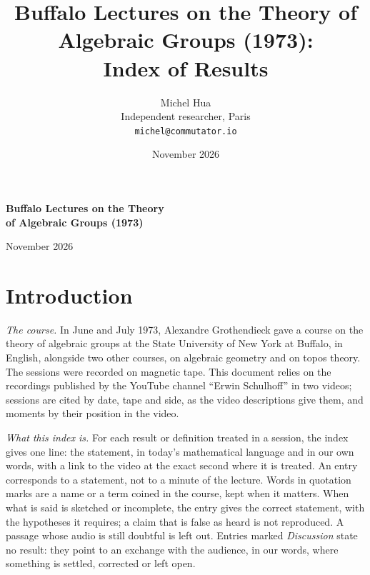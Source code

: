 \documentclass[11pt]{article}
\title{\Large Buffalo Lectures on the Theory of Algebraic Groups (1973):\\ Index of Results}
\author{Michel Hua\\ \small Independent researcher, Paris\\ \small \texttt{michel@commutator.io}}
\date{\small November 2026}
\newcommand{\q}[1]{``#1''}
\begin{document}
\begin{titlepage}
\centering\vspace*{3cm}
{\LARGE\bfseries Buffalo Lectures on the Theory\\[0.4em] of Algebraic Groups (1973)\par}
\vspace{0.8cm}{\Large Index of Results\par}
\vspace{2cm}{\large Alexandre Grothendieck, State University of New York at Buffalo\\ June--July 1973\par}
\vfill{\small November 2026\par}
\end{titlepage}
\setcounter{tocdepth}{1}
\tableofcontents
\clearpage{}
\clearpage

\section*{Introduction}

\emph{The course.} In June and July 1973, Alexandre Grothendieck gave a course on the theory of algebraic groups at the State University of New York at Buffalo, in English, alongside two other courses, on algebraic geometry and on topos theory. The sessions were recorded on magnetic tape. This document relies on the recordings published by the YouTube channel \q{Erwin Schulhoff} in two videos; sessions are cited by date, tape and side, as the video descriptions give them, and moments by their position in the video.

\emph{What this index is.} For each result or definition treated in a session, the index gives one line: the statement, in today’s mathematical language and in our own words, with a link to the video at the exact second where it is treated. An entry corresponds to a statement, not to a minute of the lecture. Words in quotation marks are a name or a term coined in the course, kept when it matters. When what is said is sketched or incomplete, the entry gives the correct statement, with the hypotheses it requires; a claim that is false as heard is not reproduced. A passage whose audio is still doubtful is left out. Entries marked \emph{Discussion} state no result: they point to an exchange with the audience, in our words, where something is settled, corrected or left open.
\end{document}
